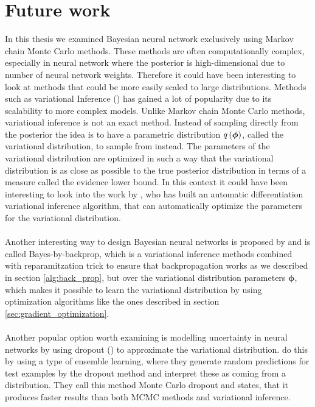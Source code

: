 \chapter{Future work}
In this thesis we examined Bayesian neural network exclusively using Markov chain Monte Carlo methods. These methods are often computationally complex, especially in neural network where the posterior is high-dimensional due to number of neural network weights. Therefore it could have been interesting to look at methods that could be more easily scaled to large distributions. Methods such as variational Inference (\cite{VI}) has gained a lot of popularity due to its scalability to more complex models. Unlike Markov chain Monte Carlo methods, variational inference is not an exact method. Instead of sampling directly from the posterior the idea is to have a parametric distribution $q\left (\boldsymbol{\phi}\right)$, called the variational distribution, to sample from instead. The parameters of the variational distribution are optimized in such a way that the variational distribution is as close as possible to the true posterior distribution in terms of a measure called the evidence lower bound. In this context it could have been interesting to look into the work by \cite{ADVI}, who has built an automatic differentiation variational inference algorithm, that can automatically optimize the parameters for the variational distribution. 
\\
\\
Another interesting way to design Bayesian neural networks is proposed by \cite{blundell2015weight} and is called Bayes-by-backprop, which is a variational inference methods combined with reparamitzation trick to ensure that backpropagation works as we described in section \ref{alg:back_prop}, but over the variational distribution parameters $\boldsymbol{\phi}$, which makes it possible to learn the variational distribution by using optimization algorithms like the ones described in section \ref{sec:gradient_optimization}. 
\\
\\
Another popular option worth examining is modelling uncertainty in neural networks by using dropout (\cite{srivastava2014dropout}) to approximate the variational distribution. \cite{mc_dropout} do this by using a type of ensemble learning, where they generate random predictions for test examples by the dropout method and interpret these as coming from a distribution. They call this method Monte Carlo dropout and states, that it produces faster results than both MCMC methods and variational inference. 

